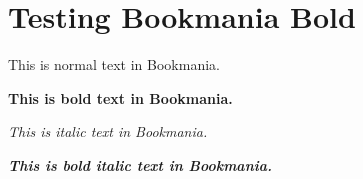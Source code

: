 \documentclass[fonts=wotc]{dndbook}
\begin{document}
\section{Testing Bookmania Bold}

This is normal text in Bookmania.

\textbf{This is bold text in Bookmania.}

\textit{This is italic text in Bookmania.}

\textbf{\textit{This is bold italic text in Bookmania.}}

\makeatletter
{}
\makeatother

\bfseries
\makeatletter
{}
\makeatother
\end{document}
